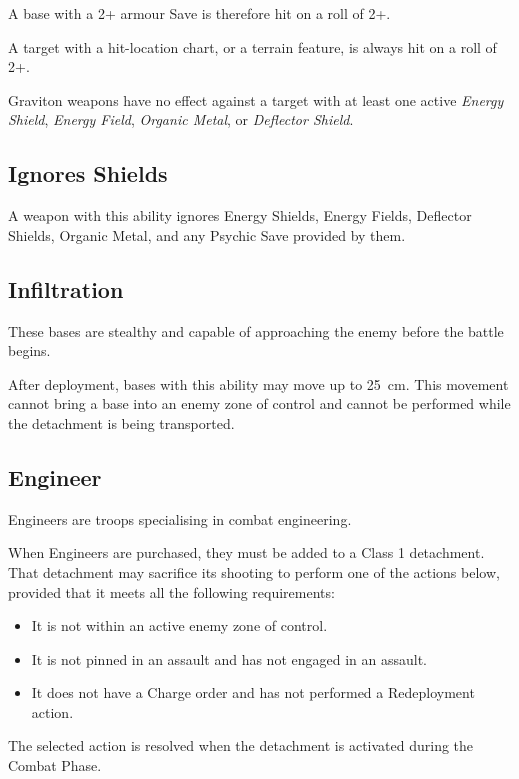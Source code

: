 A base with a 2+ armour Save is therefore hit on a roll of 2+.

A target with a hit-location chart, or a terrain feature, is always hit on a roll of 2+.

Graviton weapons have no effect against a target with at least one active \textit{Energy Shield}, \textit{Energy Field}, \textit{Organic Metal}, or \textit{Deflector Shield}.

\subsection{Ignores Shields}

A weapon with this ability ignores Energy Shields, Energy Fields, Deflector Shields, Organic Metal, and any Psychic Save provided by them.

\subsection{Infiltration}

These bases are stealthy and capable of approaching the enemy before the battle begins.

After deployment, bases with this ability may move up to 25~cm. This movement cannot bring a base into an enemy zone of control and cannot be performed while the detachment is being transported.

\subsection{Engineer}

Engineers are troops specialising in combat engineering.

When Engineers are purchased, they must be added to a Class 1 detachment. That detachment may sacrifice its shooting to perform one of the actions below, provided that it meets all the following requirements:

\begin{itemize}
    \item It is not within an active enemy zone of control.
    \item It is not pinned in an assault and has not engaged in an assault.
    \item It does not have a Charge order and has not performed a Redeployment action.
\end{itemize}

The selected action is resolved when the detachment is activated during the Combat Phase.

